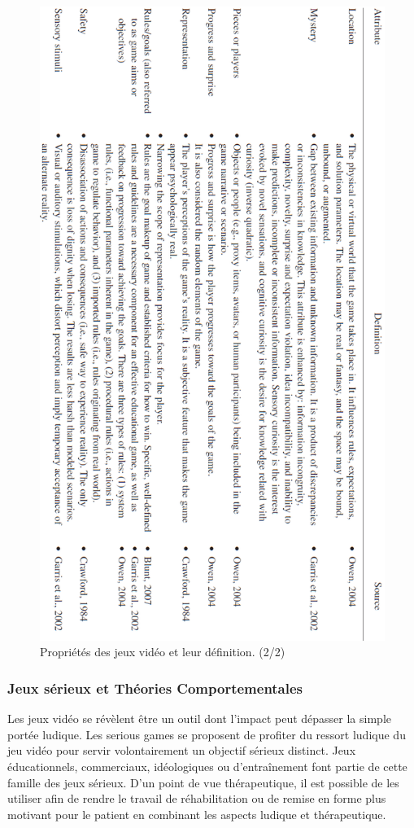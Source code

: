 \begin{figure}[htbp]
	\centering
	\includegraphics[width=\linewidth, height=\textheight ]{images/game_attributes_two}
	\caption{Propriétés des jeux vidéo et leur définition. (2/2) \cite{Wils09}}
	\label{game_attributes_two}
\end{figure}	
	
	\subsubsection{Jeux sérieux et Théories Comportementales}
Les jeux vidéo se révèlent être un outil dont l’impact peut dépasser la simple portée ludique. Les serious games se proposent de profiter du ressort ludique du jeu vidéo pour servir volontairement un objectif sérieux distinct. Jeux éducationnels, commerciaux, idéologiques ou d’entraînement font partie de cette famille des jeux sérieux. D’un point de vue thérapeutique, il est possible de les utiliser afin de rendre le travail de réhabilitation ou de remise en forme plus motivant pour le patient en combinant les aspects ludique et thérapeutique.

